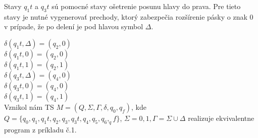 \documentclass[10pt]{article}
\begin{document}
Stavy $q_1t$ a $q_3t$ sú pomocné stavy ošetrenie posunu hlavy do prava. Pre tieto stavy je nutné vygenerovať 
prechody, ktorý zabezpečia rozšírenie pásky o znak 0 v prípade, že po delení je pod hlavou symbol $\Delta$. 

    $\delta(q_1t, \Delta) = (q_2, 0)$ \\
    $\delta(q_1t, 0) = (q_2, 0)$ \\
    $\delta(q_1t, 1) = (q_2, 1)$ \\

    $\delta(q_3t, \Delta) = (q_4, 0)$ \\
    $\delta(q_3t, 0) = (q_4, 0)$ \\
    $\delta(q_3t, 1) = (q_4, 1)$ \\

Vznikol nám TS $M = (Q, \Sigma, \Gamma, \delta, q_0, q_f)$, kde $Q = \{q_0, q_1,q_1t,q_2,q_3,q_3t,q_4,q_5,q_6,_qf\}$, $\Sigma = {0,1}, \Gamma = \Sigma \cup {\Delta}$ realizuje 
ekvivalentne program z príkladu č.1.
\end{document}
